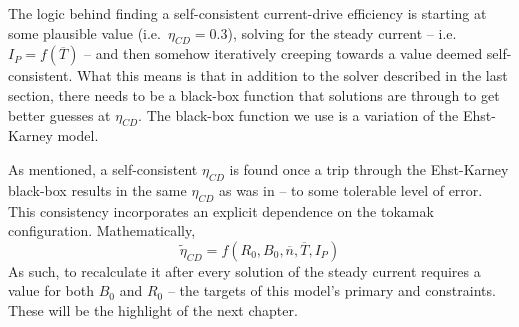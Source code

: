 The logic behind finding a self-consistent current-drive efficiency is starting at some plausible value (i.e.\ $\eta_{CD} = 0.3$), solving for the steady current -- i.e.\ $I_P = f(\overline T)$ -- and then somehow iteratively creeping towards a value deemed self-consistent. What this means is that in addition to the solver described in the last section, there needs to be a black-box function that solutions are  through to get better guesses at $\eta_{CD}$. The black-box function we use is a variation of the Ehst-Karney model. \cite{ehstkarney}

As mentioned, a self-consistent $\eta_{CD}$ is found once a trip through the Ehst-Karney black-box results in the same $\eta_{CD}$ as was  in -- to some tolerable level of error. This consistency incorporates an explicit dependence on the tokamak configuration. Mathematically,
\begin{equation}
	\tilde \eta_{CD} = f( R_0, B_0, \overline n, \overline T, I_P )
\end{equation}
As such, to recalculate it after every solution of the steady current requires a value for both $B_0$ and $R_0$ -- the targets of this model's primary and  constraints. These will be the highlight of the next chapter.

%
